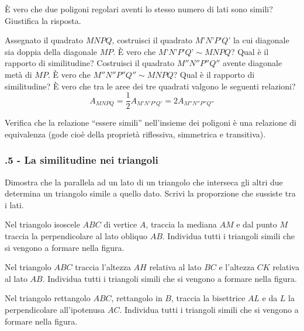\begin{multicols}{2}
\begin{esercizio}
\label{ese:6.53}
\`E vero che due poligoni regolari aventi lo stesso numero di lati sono simili? Giustifica la risposta.
\end{esercizio}

\begin{esercizio}
\label{ese:6.54}
Assegnato il quadrato $MNPQ$, costruisci il quadrato $M’N’P’Q’$ la cui diagonale sia doppia della diagonale $MP$. \`E vero che $M’N’P’Q’\sim MNPQ$? Qual è il rapporto di similitudine? Costruisci il quadrato $M''N''P''Q''$ avente diagonale metà di $MP$. \`E vero che $M''N''P''Q''\sim MNPQ$? Qual è il rapporto di similitudine? \`E vero che tra le aree dei tre quadrati valgono le seguenti relazioni?
\[A_{MNPQ}=\frac{1}{2}A_{M'N'P'Q'}=2A_{M''N''P''Q''} \]
\end{esercizio}

\begin{esercizio}
\label{ese:6.55}
Verifica che la relazione ``essere simili'' nell'insieme dei poligoni è una relazione di equivalenza (gode cioè della proprietà riflessiva, simmetrica e transitiva).
\end{esercizio}

\subsubsection*{\thechapter.5 - La similitudine nei triangoli}

\begin{esercizio}
\label{ese:6.56}
Dimostra che la parallela ad un lato di un triangolo che interseca gli altri due determina un triangolo simile a quello dato. Scrivi la proporzione che sussiste tra i lati.
\end{esercizio}

\begin{esercizio}
\label{ese:6.57}
Nel triangolo isoscele $ABC$ di vertice $A$, traccia la mediana $AM$ e dal punto $M$ traccia la perpendicolare al lato obliquo $AB$. Individua tutti i triangoli simili che si vengono a formare nella figura.
\end{esercizio}

\begin{esercizio}
\label{ese:6.58}
Nel triangolo $ABC$ traccia l'altezza $AH$ relativa al lato $BC$ e l'altezza $CK$ relativa al lato $AB$. Individua tutti i triangoli simili che si vengono a formare nella figura.
\end{esercizio}

\begin{esercizio}
\label{ese:6.59}
Nel triangolo rettangolo $ABC$, rettangolo in $B$, traccia la bisettrice $AL$ e da $L$ la perpendicolare all'ipotenusa $AC$. Individua tutti i triangoli simili che si vengono a formare nella figura.
\end{esercizio}


\end{multicols}
